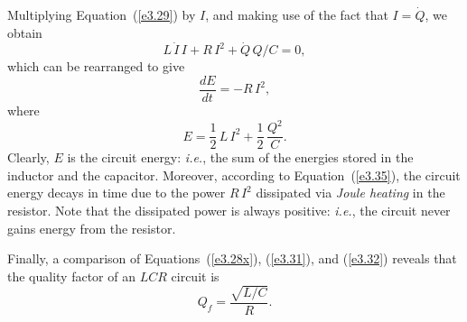 Multiplying Equation~(\ref{e3.29}) by $I$, and making use of the fact that $I=\dot{Q}$, 
we obtain
\begin{equation}
L\,\dot{I}\,I + R\,I^2+\dot{Q}\,Q/C = 0,
\end{equation}
which can be rearranged to give
\begin{equation}\label{e3.35}
\frac{dE}{dt} = - R\,I^2,
\end{equation}
where
\begin{equation}
E = \frac{1}{2}\,L\,I^2 + \frac{1}{2}\,\frac{Q^2}{C}.
\end{equation}
Clearly, $E$ is the circuit energy: {\em i.e.}, the sum of the energies stored in the inductor
and the capacitor. Moreover, according to Equation~(\ref{e3.35}), the circuit
energy decays in time due to the power $R\,I^2$ dissipated via {\em Joule heating}\/ in the resistor. Note that the dissipated power is always positive: {\em i.e.}, the circuit
never gains energy from the resistor. 

Finally, a comparison of Equations~(\ref{e3.28x}), (\ref{e3.31}), and (\ref{e3.32}) reveals
that the quality factor of an $LCR$ circuit is
\begin{equation}
Q_f = \frac{\sqrt{L/C}}{R}.
\end{equation}

